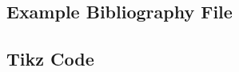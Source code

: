 \linespread{1}
\subsection{Example Bibliography File}\label{ap:code-bib}

\subsection{Tikz Code}\label{ap:code-tikz}
